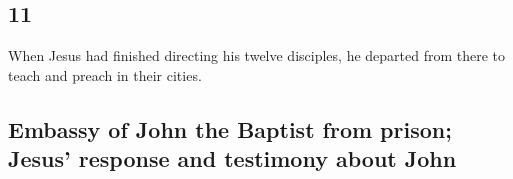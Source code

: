 \begin{paracol}{2}
\switchcolumn
\begin{otherlanguage}{english}

\hypertarget{section-21}{%
\section{11}\label{section-21}}

 When Jesus had finished directing his twelve disciples,
he departed from there to teach and preach in their cities.

\hypertarget{embassy-of-john-the-baptist-from-prison-jesus-response-and-testimony-about-john}{%
\subsection{Embassy of John the Baptist from prison; Jesus' response and
testimony about
John}\label{embassy-of-john-the-baptist-from-prison-jesus-response-and-testimony-about-john}}


\end{otherlanguage}
\end{paracol}
